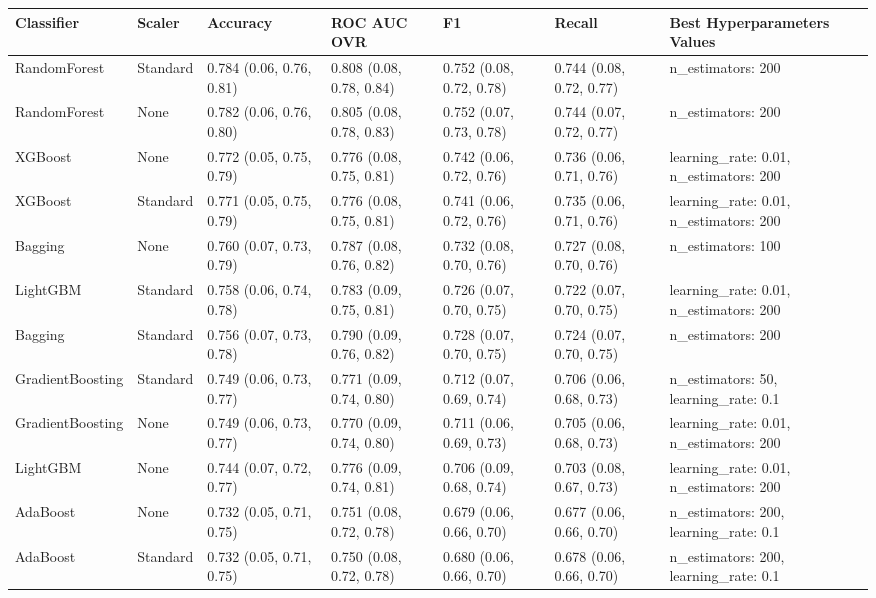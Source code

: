 \begin{tabular}{lllllll}
\toprule
Classifier & Scaler & Accuracy & ROC AUC OVR & F1 & Recall & Best Hyperparameters Values \\
\midrule
RandomForest & Standard & 0.784 (0.06, 0.76, 0.81) & 0.808 (0.08, 0.78, 0.84) & 0.752 (0.08, 0.72, 0.78) & 0.744 (0.08, 0.72, 0.77) & {{n\_estimators: 200}} \\
RandomForest & None & 0.782 (0.06, 0.76, 0.80) & 0.805 (0.08, 0.78, 0.83) & 0.752 (0.07, 0.73, 0.78) & 0.744 (0.07, 0.72, 0.77) & {{n\_estimators: 200}} \\
XGBoost & None & 0.772 (0.05, 0.75, 0.79) & 0.776 (0.08, 0.75, 0.81) & 0.742 (0.06, 0.72, 0.76) & 0.736 (0.06, 0.71, 0.76) & {{learning\_rate: 0.01, n\_estimators: 200}} \\
XGBoost & Standard & 0.771 (0.05, 0.75, 0.79) & 0.776 (0.08, 0.75, 0.81) & 0.741 (0.06, 0.72, 0.76) & 0.735 (0.06, 0.71, 0.76) & {{learning\_rate: 0.01, n\_estimators: 200}} \\
Bagging & None & 0.760 (0.07, 0.73, 0.79) & 0.787 (0.08, 0.76, 0.82) & 0.732 (0.08, 0.70, 0.76) & 0.727 (0.08, 0.70, 0.76) & {{n\_estimators: 100}} \\
LightGBM & Standard & 0.758 (0.06, 0.74, 0.78) & 0.783 (0.09, 0.75, 0.81) & 0.726 (0.07, 0.70, 0.75) & 0.722 (0.07, 0.70, 0.75) & {{learning\_rate: 0.01, n\_estimators: 200}} \\
Bagging & Standard & 0.756 (0.07, 0.73, 0.78) & 0.790 (0.09, 0.76, 0.82) & 0.728 (0.07, 0.70, 0.75) & 0.724 (0.07, 0.70, 0.75) & {{n\_estimators: 200}} \\
GradientBoosting & Standard & 0.749 (0.06, 0.73, 0.77) & 0.771 (0.09, 0.74, 0.80) & 0.712 (0.07, 0.69, 0.74) & 0.706 (0.06, 0.68, 0.73) & {{n\_estimators: 50, learning\_rate: 0.1}} \\
GradientBoosting & None & 0.749 (0.06, 0.73, 0.77) & 0.770 (0.09, 0.74, 0.80) & 0.711 (0.06, 0.69, 0.73) & 0.705 (0.06, 0.68, 0.73) & {{learning\_rate: 0.01, n\_estimators: 200}} \\
LightGBM & None & 0.744 (0.07, 0.72, 0.77) & 0.776 (0.09, 0.74, 0.81) & 0.706 (0.09, 0.68, 0.74) & 0.703 (0.08, 0.67, 0.73) & {{learning\_rate: 0.01, n\_estimators: 200}} \\
AdaBoost & None & 0.732 (0.05, 0.71, 0.75) & 0.751 (0.08, 0.72, 0.78) & 0.679 (0.06, 0.66, 0.70) & 0.677 (0.06, 0.66, 0.70) & {{n\_estimators: 200, learning\_rate: 0.1}} \\
AdaBoost & Standard & 0.732 (0.05, 0.71, 0.75) & 0.750 (0.08, 0.72, 0.78) & 0.680 (0.06, 0.66, 0.70) & 0.678 (0.06, 0.66, 0.70) & {{n\_estimators: 200, learning\_rate: 0.1}} \\

\end{tabular}
